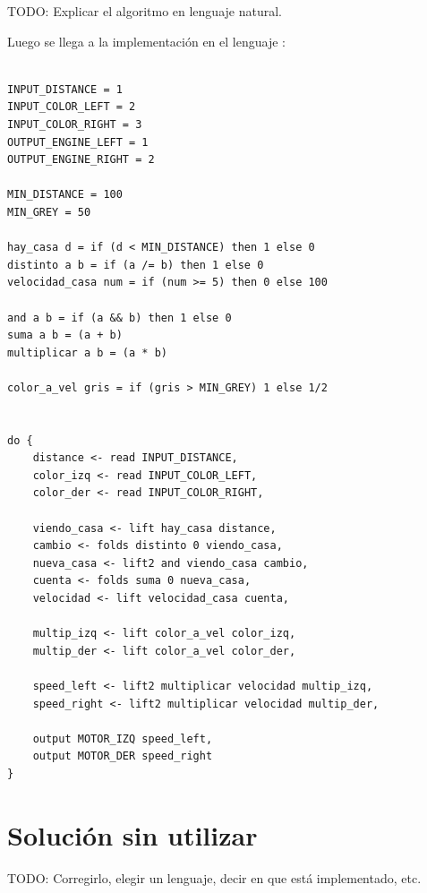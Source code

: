   TODO: Explicar el algoritmo en lenguaje natural.

  Luego se llega a la implementación en el lenguaje \frob :

\begin{verbatim}

INPUT_DISTANCE = 1
INPUT_COLOR_LEFT = 2
INPUT_COLOR_RIGHT = 3
OUTPUT_ENGINE_LEFT = 1
OUTPUT_ENGINE_RIGHT = 2

MIN_DISTANCE = 100
MIN_GREY = 50

hay_casa d = if (d < MIN_DISTANCE) then 1 else 0
distinto a b = if (a /= b) then 1 else 0
velocidad_casa num = if (num >= 5) then 0 else 100

and a b = if (a && b) then 1 else 0
suma a b = (a + b)
multiplicar a b = (a * b)

color_a_vel gris = if (gris > MIN_GREY) 1 else 1/2


do {
    distance <- read INPUT_DISTANCE,
    color_izq <- read INPUT_COLOR_LEFT,
    color_der <- read INPUT_COLOR_RIGHT,

    viendo_casa <- lift hay_casa distance,
    cambio <- folds distinto 0 viendo_casa,
    nueva_casa <- lift2 and viendo_casa cambio,
    cuenta <- folds suma 0 nueva_casa,
    velocidad <- lift velocidad_casa cuenta,

    multip_izq <- lift color_a_vel color_izq,
    multip_der <- lift color_a_vel color_der,

    speed_left <- lift2 multiplicar velocidad multip_izq,
    speed_right <- lift2 multiplicar velocidad multip_der,

    output MOTOR_IZQ speed_left,
    output MOTOR_DER speed_right
}

\end{verbatim}

\section{Solución sin utilizar \frob}

TODO: Corregirlo, elegir un lenguaje, decir en que está implementado, etc.

